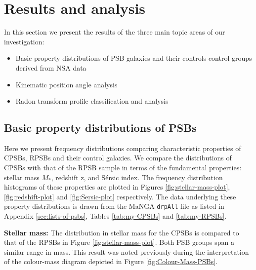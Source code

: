 \section{Results and analysis}
\label{sec:results}

In this section we present the results of the three main topic areas of our investigation:

\begin{itemize}
    \item Basic property distributions of PSB galaxies and their controls control groups derived from NSA data
    \item Kinematic position angle analysis
    \item Radon transform profile classification and analysis
\end{itemize}

\subsection{Basic property distributions of PSBs}
\label{sec:property-distributions}
Here we present frequency distributions comparing characteristic properties of CPSBs, RPSBs and their control galaxies. We compare the distributions of CPSBs with that of the RPSB sample in terms of the fundamental properties: stellar mass $M_*$, redshift z, and S\'ersic index. The frequency distribution histograms of these properties are plotted in Figures \ref{fig:stellar-mass-plot}, \ref{fig:redshift-plot} and \ref{fig:Sersic-plot} respectively. The data underlying these property distributions is drawn from the MaNGA \texttt{drpAll} file as listed in Appendix \ref{sec:lists-of-psbs}, Tables \ref{tab:my-CPSBs} and \ref{tab:my-RPSBs}.

\textbf{Stellar mass:} The distribution in stellar mass for the CPSBs is compared to that of the RPSBs in Figure \ref{fig:stellar-mass-plot}. Both PSB groups span a similar range in mass. This result was noted previously during the interpretation of the colour-mass diagram depicted in Figure \ref{fig:Colour-Mass-PSBs}.

